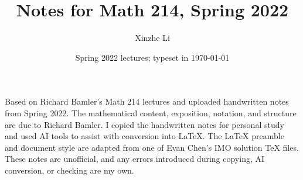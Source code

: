 \documentclass[11pt]{scrartcl}
\title{Notes for Math 214, Spring 2022}
\author{Xinzhe Li}
\date{Spring 2022 lectures; typeset in \today}
\begin{document}
\maketitle
\vfill

{\footnotesize
Based on Richard Bamler's Math 214 lectures and uploaded handwritten notes
from Spring 2022. The mathematical content, exposition, notation, and structure
are due to Richard Bamler. I copied the handwritten notes for personal study
and used AI tools to assist with conversion into \LaTeX{}. The \LaTeX{} preamble and document style are adapted from one of Evan Chen's
IMO solution TeX files. These notes are
unofficial, and any errors introduced during copying, AI conversion, or checking
are my own.
\par}

\newpage
\tableofcontents
\newpage





\end{document}
